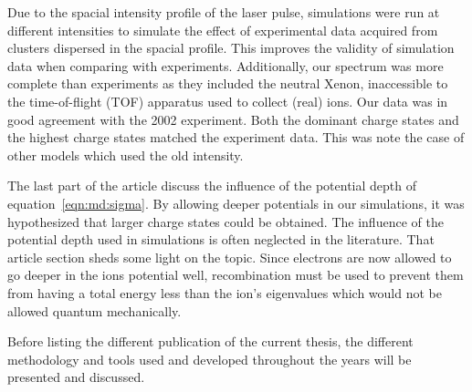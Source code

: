 Due to the spacial intensity profile of the laser pulse, simulations were run
at different intensities to simulate the effect of experimental data acquired
from clusters dispersed in the spacial profile. This improves the validity of
simulation data when comparing with experiments. Additionally, our spectrum
was more complete than experiments as they included the neutral Xenon,
inaccessible to the time-of-flight (TOF) apparatus used to collect (real) ions.
Our data was in good agreement with the 2002 experiment. Both the dominant
charge states and the highest charge states matched the experiment data. This
was note the case of other models which used the old intensity.

The last part of the article discuss the influence of the potential depth
of equation~\eqref{eqn:md:sigma}.
By allowing deeper potentials in our
simulations, it was hypothesized that larger charge states could be obtained.
The influence of the potential depth used in simulations is often neglected in
the literature. That article section sheds some light on the topic.
Since electrons are now allowed to go deeper in the ions potential well,
recombination must be used to prevent them from having a total energy less than
the ion's eigenvalues which would not be allowed quantum mechanically.


Before listing the different publication of the current thesis, the different
methodology and tools used and developed throughout the years will be presented
and discussed.




